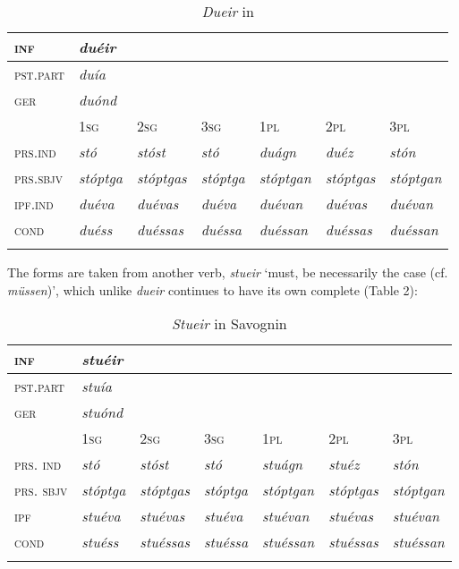 \documentclass[output=paper,
modfonts
]{LSP/langsci}
\begin{document}
\begin{longtable}[]{@{}lllllll@{}}
\caption{\label{tab:maiden:1}\emph{Dueir} in }\\
\lsptoprule
\textsc{inf} & \emph{duéir} & & & & &\tabularnewline
\midrule
\endhead
\textsc{pst.part} & \emph{duía} & & & & &\tabularnewline
\textsc{ger} & \emph{duónd} & & & & &\tabularnewline
& \textsc{1sg} & \textsc{2sg} & \textsc{3sg} & \textsc{1pl} &
\textsc{2pl} & \textsc{3pl}\tabularnewline
\textsc{prs.ind} & \emph{stó} & \emph{stóst} & \emph{stó} & \emph{duágn}
& \emph{duéz} & \emph{stón}\tabularnewline
\textsc{prs.sbjv} & \emph{stóptga} & \emph{stóptgas} & \emph{stóptga} &
\emph{stóptgan} & \emph{stóptgas} & \emph{stóptgan}\tabularnewline
\textsc{ipf.ind} & \emph{duéva} & \emph{duévas} & \emph{duéva} &
\emph{duévan} & \emph{duévas} & \emph{duévan}\tabularnewline
\textsc{cond} & \emph{duéss} & \emph{duéssas} & \emph{duéssa} &
\emph{duéssan} & \emph{duéssas} & \emph{duéssan}\tabularnewline
\lspbottomrule
\end{longtable}

The  forms are taken from another verb, \emph{stueir} `must,
be necessarily the case (cf.  \emph{müssen})', which unlike
\emph{dueir} continues to have its own complete  (Table 2):


\begin{longtable}[]{@{}lllllll@{}}
\caption{\emph{Stueir} in Savognin}\\
\lsptoprule
\textsc{inf} & \emph{stuéir} & & & & &\tabularnewline
\midrule
\endhead
\textsc{pst.part} & \emph{stuía} & & & & &\tabularnewline
\textsc{ger} & \emph{stuónd} & & & & &\tabularnewline
& \textsc{1sg} & \textsc{2sg} & \textsc{3sg} & \textsc{1pl} &
\textsc{2pl} & \textsc{3pl}\tabularnewline
\textsc{prs. ind} & \emph{stó} & \emph{stóst} & \emph{stó} &
\emph{stuágn} & \emph{stuéz} & \emph{stón}\tabularnewline
\textsc{prs. sbjv} & \emph{stóptga} & \emph{stóptgas} & \emph{stóptga} &
\emph{stóptgan} & \emph{stóptgas} & \emph{stóptgan}\tabularnewline
\textsc{ipf} & \emph{stuéva} & \emph{stuévas} & \emph{stuéva} &
\emph{stuévan} & \emph{stuévas} & \emph{stuévan}\tabularnewline
\textsc{cond} & \emph{stuéss} & \emph{stuéssas} & \emph{stuéssa} &
\emph{stuéssan} & \emph{stuéssas} & \emph{stuéssan}\tabularnewline
\lspbottomrule
\end{longtable}
\end{document}
